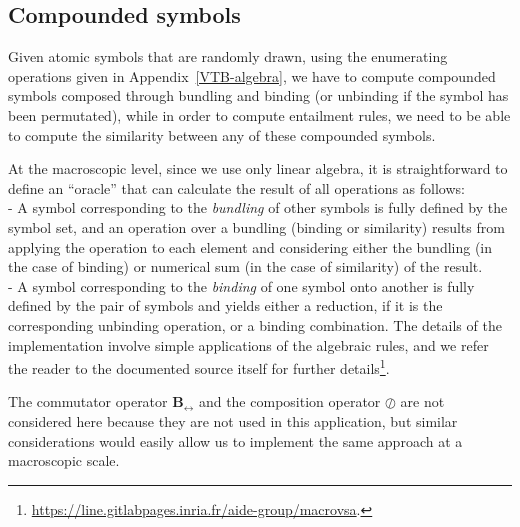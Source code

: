 \documentclass[sn-mathphys]{sn-jnl}
\newcommand{\hhref}[1]{\href{#1}{#1}}
\begin{document}
\begin{appendices}
\subsection*{Compounded symbols}

Given atomic symbols that are randomly drawn, using the enumerating operations given in Appendix~\ref{VTB-algebra}, we have to compute compounded symbols composed through bundling and binding (or unbinding if the symbol has been permutated), while in order to compute entailment rules, we need to be able to compute the similarity between any of these compounded symbols. 

At the macroscopic level, since we use only linear algebra, it is straightforward to define an ``oracle'' that can calculate the result of all operations as follows:
\\- A symbol corresponding to the {\em bundling} of other symbols is fully defined by the symbol set, and an operation over a bundling (binding or similarity) results from applying the operation to each element and considering either the bundling (in the case of binding) or numerical sum (in the case of similarity) of the result.
\\- A symbol corresponding to the {\em binding} of one symbol onto another is fully defined by the pair of symbols and yields either a reduction, if it is the corresponding unbinding operation, or a binding combination.
The details of the implementation involve simple applications of the algebraic rules, and we refer the reader to the documented source itself for further details\footnote{\hhref{https://line.gitlabpages.inria.fr/aide-group/macrovsa}.}.

The commutator operator $\mathbf{B_{\leftrightarrow}}$ and the composition operator $\oslash$ are not considered here because they are not used in this application, but similar considerations would easily allow us to implement the same approach at a macroscopic scale.

\end{appendices}

%

\end{document}
